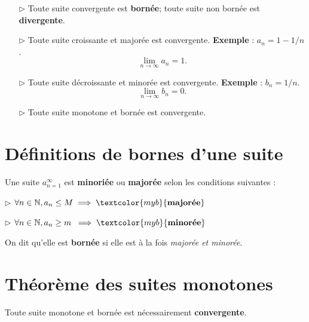 \documentclass{report}
\begin{document}
\begin{multicols*}{3}
\begin{itemize}
        \item[$\rhd$] Toute suite convergente est \textbf{bornée};  
            toute suite non bornée est \textbf{divergente}.        
        \item[$\rhd$] Toute suite croissante et majorée est convergente. 
            \textbf{Exemple} : \( a_n = 1 - 1/n \). 
        \[
        \lim_{n \to \infty} a_n = 1.
        \]
        
        \item[$\rhd$] Toute suite décroissante et minorée est convergente. \textbf{Exemple} : \( b_n = 1/n \).
        \[
        \lim_{n \to \infty} b_n = 0.
        \]
        
        \item[$\rhd$] Toute suite monotone et bornée est convergente.
    \end{itemize}


     \section{Définitions de bornes d'une suite} 
     Une suite $a_{n = 1}^{\infty}$ est \textbf{minoriée} ou 
     \textbf{majorée} selon les conditions suivantes :

     \noindent$\rhd$ 
     $\forall n \in \mathbb{N}, a_n \leq M \implies \textcolor{myb}{\textbf{majorée}} $
     
     \noindent
     $\rhd$ $\forall n \in \mathbb{N}, a_n \geq m  \; \implies \textcolor{myb}{\textbf{minorée}}$
     
     On dit qu'elle est \textcolor{myr}{\textbf{bornée}} si elle est à la fois  
     \textit{majorée et minorée}.      
     \vspace{0.25em}

     \section{Théorème des suites monotones}
        Toute suite monotone et bornée est nécessairement \textbf{convergente}.  

    \begin{center}
\end{center}
\end{multicols*}
\end{document}
